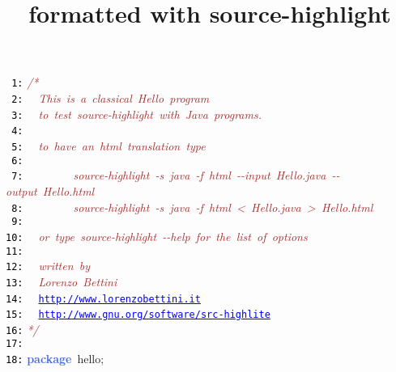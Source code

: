 \documentclass{article}
\title{formatted with source-highlight}
\date{}
\begin{document}
\maketitle
\noindent
\mbox{}\texttt{\textcolor{Black}{ 1:}} \textit{\textcolor{Brown}{/*}} \\
\mbox{}\texttt{\textcolor{Black}{ 2:}} \textit{\textcolor{Brown}{\ \ This\ is\ a\ classical\ Hello\ program}} \\
\mbox{}\texttt{\textcolor{Black}{ 3:}} \textit{\textcolor{Brown}{\ \ to\ test\ source-highlight\ with\ Java\ programs.}} \\
\mbox{}\texttt{\textcolor{Black}{ 4:}} \textit{\textcolor{Brown}{\ \ }} \\
\mbox{}\texttt{\textcolor{Black}{ 5:}} \textit{\textcolor{Brown}{\ \ to\ have\ an\ html\ translation\ type}} \\
\mbox{}\texttt{\textcolor{Black}{ 6:}}  \\
\mbox{}\texttt{\textcolor{Black}{ 7:}} \textit{\textcolor{Brown}{\ \ \ \ \ \ \ \ source-highlight\ -s\ java\ -f\ html\ -\/-input\ Hello.java\ -\/-output\ Hello.html}} \\
\mbox{}\texttt{\textcolor{Black}{ 8:}} \textit{\textcolor{Brown}{\ \ \ \ \ \ \ \ source-highlight\ -s\ java\ -f\ html\ \textless{}\ Hello.java\ \textgreater{}\ Hello.html}} \\
\mbox{}\texttt{\textcolor{Black}{ 9:}}  \\
\mbox{}\texttt{\textcolor{Black}{10:}} \textit{\textcolor{Brown}{\ \ or\ type\ source-highlight\ -\/-help\ for\ the\ list\ of\ options}} \\
\mbox{}\texttt{\textcolor{Black}{11:}}  \\
\mbox{}\texttt{\textcolor{Black}{12:}} \textit{\textcolor{Brown}{\ \ written\ by}} \\
\mbox{}\texttt{\textcolor{Black}{13:}} \textit{\textcolor{Brown}{\ \ Lorenzo\ Bettini}} \\
\mbox{}\texttt{\textcolor{Black}{14:}} \textit{\textcolor{Brown}{\ \ }}\underline{\texttt{\textcolor{Blue}{http://www.lorenzobettini.it}}} \\
\mbox{}\texttt{\textcolor{Black}{15:}} \textit{\textcolor{Brown}{\ \ }}\underline{\texttt{\textcolor{Blue}{http://www.gnu.org/software/src-highlite}}} \\
\mbox{}\texttt{\textcolor{Black}{16:}} \textit{\textcolor{Brown}{*/}} \\
\mbox{}\texttt{\textcolor{Black}{17:}}  \\
\mbox{}\texttt{\textcolor{Black}{18:}} \textbf{\textcolor{RoyalBlue}{package}}\ hello\textcolor{BrickRed}{;} \\
\end{document}
